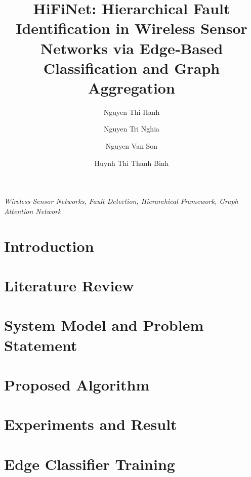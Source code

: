 \documentclass[preprint,12pt]{elsarticle}
\begin{document}
\begin{frontmatter}

\title{HiFiNet: Hierarchical Fault Identification in Wireless Sensor Networks via Edge‑Based Classification and Graph Aggregation}

\author[fidt:pnk]{Nguyen Thi Hanh}
\author[hust]{Nguyen Tri Nghia}
\author[fcs:pnk]{Nguyen Van Son}
\author[hust]{Huynh Thi Thanh Binh}
\address[fidt:pnk]{Faculty of Interdisciplinary Digital Technology (FIDT), PHENIKAA University, Vietnam}
\address[hust]{Hanoi University of Science and Technology, Vietnam}
\address[fcs:pnk]{Faculty of Computer Science, PHENIKAA University, Yen Nghia, Ha Dong, Hanoi 12116, Vietnam}



\begin{keyword}
\textit{Wireless Sensor Networks, Fault Detection, Hierarchical Framework, Graph Attention Network}
\end{keyword}

\end{frontmatter}

\section{Introduction}


\section{Literature Review}


\section{System Model and Problem Statement}


\section{Proposed Algorithm}


\section{Experiments and Result}


\clearpage


\clearpage
\appendix
\section{Edge Classifier Training}
\label{app:edge_training}

\end{document}
